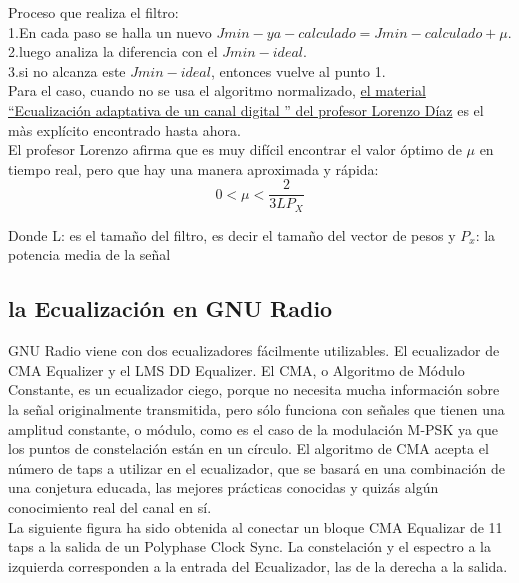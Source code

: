 Proceso que realiza el filtro: \\

1.En cada paso se halla un nuevo $Jmin-ya-calculado=Jmin-calculado+ \mu$. \\

2.luego analiza la diferencia con el $Jmin-ideal$. \\

3.si no alcanza este $Jmin-ideal$, entonces vuelve al punto 1. \\

Para el caso, cuando no se usa el algoritmo normalizado,  \textcolor{blue}{\href{https://drive.google.com/file/d/1XoqU-Hh8m18M3muvptJiY-LHh5bgdcwV/view?usp=sharing}{el material “Ecualización adaptativa de un canal digital ” del profesor Lorenzo Díaz}} es el màs explícito encontrado hasta ahora. \\

El profesor Lorenzo afirma que es muy difícil encontrar el valor óptimo de $ \mu$ en tiempo real, pero que hay una manera aproximada y rápida: \\

\begin{equation} \label{capcuatro_cincuentaycuatro}
	 0 < \mu <\dfrac{2}{3LP_{X}}
\end{equation}

Donde L: es el tamaño del filtro, es decir el tamaño del vector de pesos y $P_{x}$: la potencia media de la señal


\subsection{la Ecualización en GNU Radio}
	
GNU Radio viene con dos ecualizadores fácilmente utilizables. El ecualizador de CMA Equalizer y el LMS DD Equalizer. El CMA, o Algoritmo de Módulo Constante, es un ecualizador ciego, porque no necesita mucha información sobre la señal originalmente transmitida, pero sólo funciona con señales que tienen una amplitud constante, o módulo, como es el caso de la modulación M-PSK ya que los puntos de constelación están en un círculo. El algoritmo de CMA acepta el número de taps a utilizar en el ecualizador, que se basará en una combinación de una conjetura educada, las mejores prácticas conocidas y quizás algún conocimiento real del canal en sí. \\

La siguiente figura ha sido obtenida al conectar un bloque CMA Equalizar de 11 taps a la salida de un Polyphase Clock Sync. La constelación y el espectro a la izquierda corresponden a la entrada del Ecualizador, las de la derecha a la salida. \\

